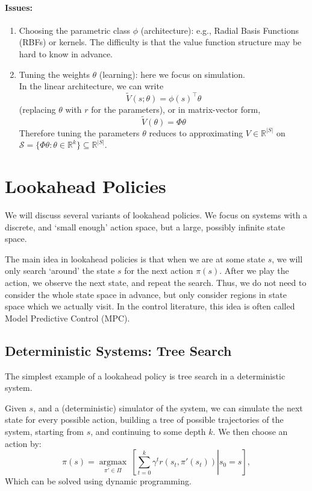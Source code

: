 \begin{enumerate}
\paragraph{Issues:}
\begin{enumerate}
\item Choosing the parametric class $\phi$ (architecture): e.g., Radial Basis Functions (RBFs) or kernels. The difficulty is that the value function structure may be hard to know in advance.
\item Tuning the weights $\theta$ (learning): here we focus on simulation.\\
In the linear architecture, we can write
$$\tilde{V}(s;\theta)=\phi(s)^\top \theta$$
(replacing $\theta$ with $r$ for the parameters), or in matrix-vector form,
$$\tilde{ {V}}( {\theta}) =  { {\Phi}} { \theta}$$
Therefore tuning the parameters $ {\theta}$ reduces to approximating $ {V} \in \mathbb{R}^{|S|}$ on $\mathcal{S}=\{  { {\Phi}} {\theta}:  {\theta} \in \mathbb{R}^k\} \subseteq  \mathbb{R}^{|S|} $.

\end{enumerate}

\end{enumerate}

\section{Lookahead Policies}

We will discuss several variants of lookahead policies. We focus on systems with a discrete, and `small enough' action space, but a large, possibly infinite state space.

The main idea in lookahead policies is that when we are at some state $s$, we will only search `around' the state $s$ for the next action $\pi(s)$. After we play the action, we observe the next state, and repeat the search.
Thus, we do not need to consider the whole state space in advance, but only consider regions in state space which we actually visit.
In the control literature, this idea is often called Model Predictive Control (MPC).

\subsection{Deterministic Systems: Tree Search}
The simplest example of a lookahead policy is tree search in a deterministic system.

Given $s$, and a (deterministic) simulator of the system, we can simulate the next state for every possible action, building a tree of possible trajectories of the system, starting from $s$, and continuing to some depth $k$. 
We then choose an action by:
$$\pi(s) = \underset{\pi' \in \Pi}{\operatorname{argmax}}\  \left[\left.\sum_{t=0}^{k} \gamma^t r(s_{t},{\pi'}(s_{t})) \right| s_0 = s\right],$$
Which can be solved using dynamic programming.

